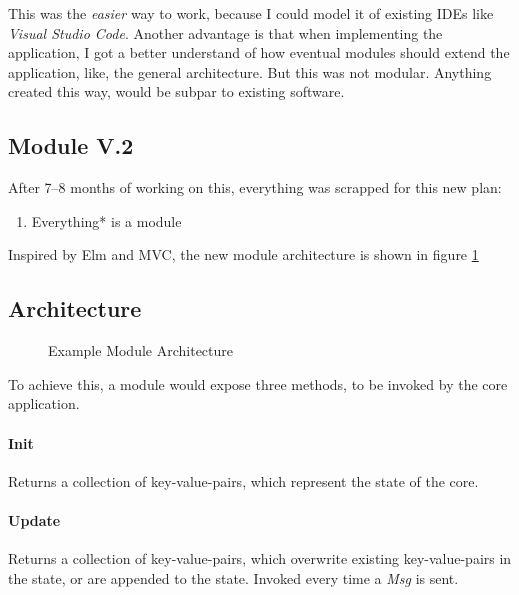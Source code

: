 This was the \textit{easier} way to work, because I could model it of existing
IDEs like \textit{Visual Studio Code}. Another advantage is that when
implementing the application, I got a better understand of how eventual modules
should extend the application, like, the general architecture. But this was not
modular. Anything created this way, would be subpar to existing software.

\subsection{Module V.2}


After 7–8 months of working on this, everything was scrapped for this new plan:
\begin{enumerate}
  \item Everything* is a module
\end{enumerate}

Inspired by Elm and MVC, the new module architecture is shown in figure
\ref{fig:moduleArchitecture}

\subsection{Architecture}
\begin{figure}
  \centering
  
  \caption{Example Module Architecture}
  \label{fig:moduleArchitecture}
\end{figure}

To achieve this, a module would expose three methods, to be invoked by the core
application.

\paragraph{Init} Returns a collection of key-value-pairs, which represent
the state of the core.

\paragraph{Update} Returns a collection of key-value-pairs, which
overwrite existing key-value-pairs in the state, or are appended to the state.
Invoked every time a \textit{Msg} is sent.


